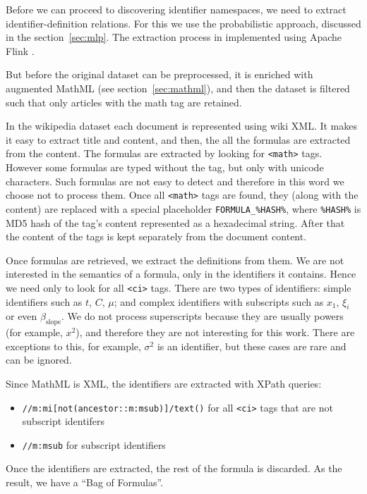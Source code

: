 Before we can proceed to discovering identifier namespaces, we  
need to extract identifier-definition relations. For this we use the probabilistic 
approach, discussed in the section~\ref{sec:mlp}. 
The extraction process in implemented using Apache Flink \cite{flink}.

But before the original dataset can be preprocessed, it is enriched with 
augmented MathML (see section~\ref{sec:mathml}), 
and then the dataset is filtered such that only articles with
the math tag are retained. 

In the wikipedia dataset each document is represented using wiki XML. It 
makes it easy to extract title and content, and then, the all the formulas 
are extracted from the content. The formulas are extracted by 
looking for \verb|<math>| tags. However some formulas are typed without 
the tag, but only with unicode characters. Such formulas are not easy to 
detect and therefore in this word we choose not to process them.
Once all \verb|<math>| tags are found, they (along with the content) 
are replaced with a special placeholder \verb|FORMULA_%HASH%|, where 
\verb|%HASH%| is MD5 hash \cite{rivest1992md5} of the tag's content represented as 
a hexadecimal string. After that 
the content of the tags is kept separately from the document content. 

Once formulas are retrieved, we extract the definitions from them. 
We are not interested in the semantics of a formula, only in the identifiers 
it contains. Hence we need only to look for all \verb|<ci>| tags. 
There are two types of identifiers: simple identifiers such as 
$t$, $C$, $\mu$; and complex identifiers with subscripts such as
$x_1$, $\xi_i$ or even $\beta_{\text{slope}}$. We do not process 
superscripts because they are usually powers (for example, $x^2$), 
and therefore they are not interesting for this work. 
There are exceptions to this, for example, $\sigma^2$ is an identifier,
but these cases are rare and can be ignored. 

Since MathML is XML, the identifiers are extracted with XPath queries:

\begin{itemize}
  \item \verb|//m:mi[not(ancestor::m:msub)]/text()| for all \verb|<ci>| tags
that are not subscript identifers
  \item \verb|//m:msub| for subscript identifiers
\end{itemize}

Once the identifiers are extracted, the rest of the formula is discarded. 
As the result, we have a ``Bag of Formulas''.


